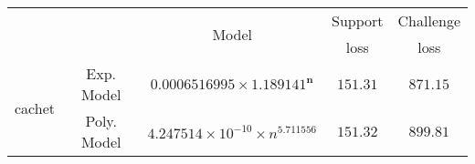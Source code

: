 \begin{tabular}{ccccc} 
\hline 
 &  & \multirow{2}{*}{Model} & Support & Challenge\tabularnewline 
 &  &  & loss  & loss\tabularnewline 
\hline 
\hline 
\multirow{2}{*}{cachet} & Exp. Model & $\mathbf{0.0006516995\times 1.189141^{n}}$ & $\mathbf{151.31}$ & $\mathbf{871.15}$ \tabularnewline 
 & Poly. Model & $4.247514\times10^{-10}\times n^{5.711556}$ & $151.32$ & $899.81$ \tabularnewline 
\hline 
\end{tabular} 

